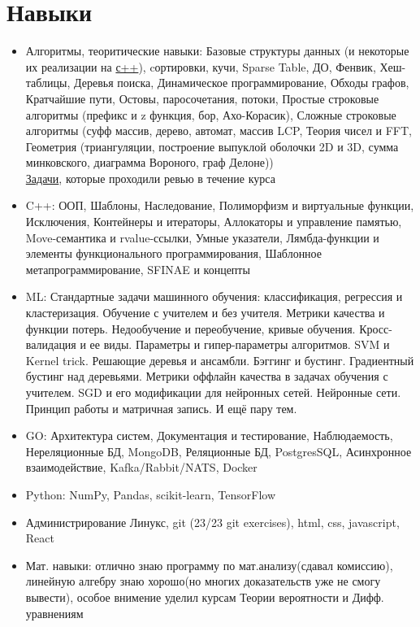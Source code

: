 \documentclass[a4paper,10pt]{article}
\begin{document}
\section*{Навыки}
\noindent
\begin{itemize}[noitemsep]
    \item Алгоритмы, теоритические навыки: Базовые структуры данных (и некоторые их реализации на \href{https://github.com/grgtr/MIPT-CPP}{с++}), cортировки, кучи, Sparse Table, ДО, Фенвик, Хеш-таблицы, Деревья поиска, Динамическое программирование, Обходы графов, Кратчайшие пути, Остовы, паросочетания, потоки, Простые строковые алгоритмы (префикс и z функция, бор, Ахо-Корасик), Сложные строковые алгоритмы (суфф массив, дерево, автомат, массив LCP, Теория чисел и FFT, Геометрия (триангуляции, построение выпуклой оболочки 2D и 3D, сумма минковского, диаграмма Вороного, граф Делоне)) \\
    \href{https://gitlab.com/grgtr}{Задачи}, которые проходили ревью в течение курса
    \item C++: ООП, Шаблоны, Наследование, Полиморфизм и виртуальные функции, Исключения, Контейнеры и итераторы, Аллокаторы и управление памятью, Move-семантика и rvalue-ссылки, Умные указатели, Лямбда-функции и элементы функционального программирования, Шаблонное метапрограммирование, SFINAE и концепты
    \item ML: Стандартные задачи машинного обучения: классификация, регрессия и кластеризация. Обучение с учителем и без учителя. Метрики качества и функции потерь. Недообучение и переобучение, кривые обучения. Кросс-валидация и ее виды. Параметры и гипер-параметры алгоритмов.
    SVM и Kernel trick.
    Решающие деревья и ансамбли.
    Бэггинг и бустинг.
    Градиентный бустинг над деревьями.
    Метрики оффлайн качества в задачах обучения с учителем.
    SGD и его модификации для нейронных сетей.
    Нейронные сети. Принцип работы и матричная запись. 
    И ещё пару тем.
    \item GO: Архитектура систем, Документация и тестирование, Наблюдаемость, Нереляционные БД, MongoDB, Реляционные БД, PostgresSQL, Асинхронное взаимодействие, Kafka/Rabbit/NATS, Docker
    \item Python: NumPy, Pandas, scikit-learn, TensorFlow
    \item Администрирование Линукс, git (23/23 git exercises), html, css, javascript, React
    \item Мат. навыки: отлично знаю программу по мат.анализу(сдавал комиссию), линейную алгебру знаю хорошо(но многих доказательств уже не смогу вывести), особое внимение уделил курсам Теории вероятности и Дифф. уравнениям
\end{itemize}
\end{document}
